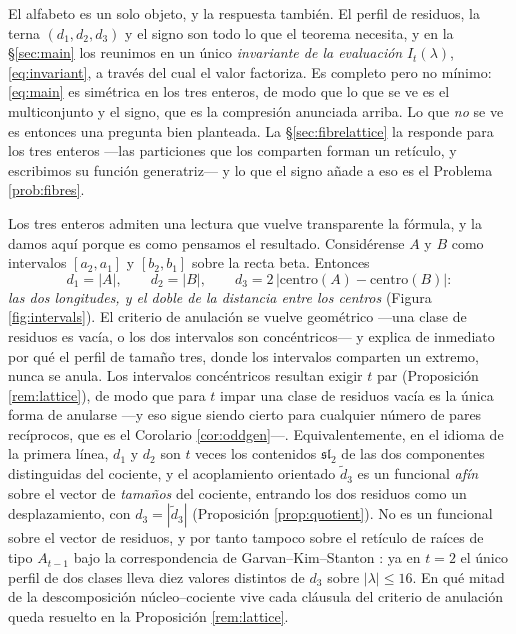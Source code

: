 \documentclass[11pt,reqno]{amsart}
\theoremstyle{plain}
\theoremstyle{definition}
\begin{document}
El alfabeto es un solo objeto, y la respuesta también. El perfil de residuos, la terna
$(d_1,d_2,d_3)$ y el signo son todo lo que el teorema necesita, y en la \S\ref{sec:main} los
reunimos en un único \emph{invariante de la evaluación} $I_t(\lambda)$, \eqref{eq:invariant}, a
través del cual el valor factoriza. Es completo pero no mínimo: \eqref{eq:main} es simétrica en los
tres enteros, de modo que lo que se ve es el multiconjunto y el signo, que es la compresión
anunciada arriba. Lo que \emph{no} se ve es entonces una pregunta bien planteada. La
\S\ref{sec:fibrelattice} la responde para los tres enteros ---las particiones que los comparten
forman un retículo, y escribimos su función generatriz--- y lo que el signo añade a eso es el
Problema \ref{prob:fibres}.

Los tres enteros admiten una lectura que vuelve transparente la fórmula, y la damos aquí porque es
como pensamos el resultado. Considérense $A$ y $B$ como intervalos $[a_2,a_1]$ y $[b_2,b_1]$ sobre la
recta beta. Entonces
\begin{equation}\label{eq:intervals}
d_1=|A|,\qquad d_2=|B|,\qquad d_3=2\,\bigl|\mathrm{centro}(A)-\mathrm{centro}(B)\bigr| :
\end{equation}
\emph{las dos longitudes, y el doble de la distancia entre los centros} (Figura
\ref{fig:intervals}). El criterio de anulación se vuelve geométrico ---una clase de residuos es
vacía, o los dos intervalos son concéntricos--- y explica de inmediato por qué el perfil de tamaño
tres, donde los intervalos comparten un extremo, nunca se anula. Los intervalos concéntricos
resultan exigir $t$ par (Proposición \ref{rem:lattice}), de modo que para $t$ impar una clase de
residuos vacía es la única forma de anularse ---y eso sigue siendo cierto para cualquier número de
pares recíprocos, que es el Corolario \ref{cor:oddgen}---. Equivalentemente, en el idioma de la
primera línea, $d_1$ y $d_2$ son $t$ veces los contenidos $\mathfrak{sl}_2$ de las dos componentes
distinguidas del cociente, y el acoplamiento orientado $\tilde d_3$ es un funcional \emph{afín} sobre
el vector de \emph{tamaños} del cociente, entrando los dos residuos como un desplazamiento, con
$d_3=|\tilde d_3|$ (Proposición \ref{prop:quotient}). No es
un funcional sobre el vector de residuos, y por tanto tampoco sobre el retículo de raíces de tipo
$A_{t-1}$ bajo la correspondencia de Garvan--Kim--Stanton \cite{GKS90}: ya en $t=2$ el único perfil
de dos clases lleva diez valores distintos de $d_3$ sobre $|\lambda|\le16$. En qué mitad de la
descomposición núcleo--cociente vive cada cláusula del criterio de anulación queda resuelto en la
Proposición \ref{rem:lattice}.
\end{document}
